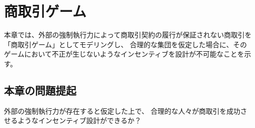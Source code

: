 \chapter{商取引ゲーム}
本章では、外部の強制執行力によって商取引契約の履行が保証されない商取引を「商取引ゲーム」としてモデリングし、
合理的な集団を仮定した場合に、そのゲームにおいて不正が生じないようなインセンティブを設計が不可能なことを示す。







\section{本章の問題提起}
外部の強制執行力が存在すると仮定した上で、
合理的な人々が商取引を成功させるようなインセンティブ設計ができるか？

